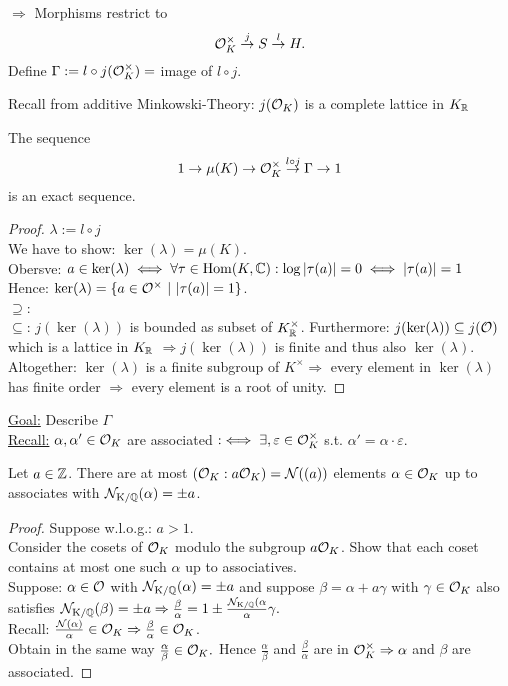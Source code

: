 
$\Rightarrow$ Morphisms restrict to
\[ \mathcal{O}_K^\times \stackrel{j}{\to} S \stackrel{l}{\to} H.\]
Define $\Gamma:= l \circ j (\mathcal{O}_K^\times) =$ image of $l \circ j$.

Recall from additive Minkowski-Theory: $j( \mathcal{O}_K)$ is a complete lattice in $K_{\mathbb{R}}$

\begin{Prop}
The sequence
\[1 \to \mu(K) \to \mathcal{O}_K^\times \stackrel{l \circ j}{\to} \Gamma \to 1\]
is an exact sequence.
\end{Prop}

\begin{proof}
$\lambda:= l \circ j$\\
We have to show: $\ker(\lambda)=\mu(K)$.\\
Obersve: $a \in \ker(\lambda) \iff \forall \tau \in \operatorname{Hom}(K, \mathbb{C}) : \log|\tau(a)|=0 \iff |\tau(a)|=1$\\
Hence: $\ker(\lambda) = \{a \in \mathcal{O}^\times \ | \ |\tau(a)|=1\}$.\\
\glqq $\supseteq$\grqq: \checkmark\\
\glqq $\subseteq$\grqq: $j(\ker(\lambda))$ is bounded as subset of $K_{\mathbb{R}}^\times$. Furthermore: $j(\ker(\lambda)) \subseteq j(\mathcal{O})$ which is a lattice in $K_{\mathbb{R}}$
$\Rightarrow j(\ker(\lambda))$ is finite and thus also $\ker(\lambda)$.\\
Altogether: $\ker(\lambda)$ is a finite subgroup of $K^\times \Rightarrow$ every element in $\ker(\lambda)$ has finite order $\Rightarrow$ every element is a root of unity.
\end{proof}

\underline{Goal:} Describe $\Gamma$\\
\underline{Recall:} $\alpha, \alpha' \in \mathcal{O}_K$ are associated $:\iff \exists, \varepsilon \in \mathcal{O}^\times_K$ s.t. $\alpha'=\alpha\cdot \varepsilon$.

\begin{Prop}
Let $a \in \mathbb{Z}$. There are at most $(\mathcal{O}_K: a\mathcal{O}_K)=\operatorname{\mathcal{N}}((a))$ elements $\alpha \in \mathcal{O}_K$ up to associates with $\operatorname{\mathcal{N}_{K/\mathbb{Q}}}(\alpha)=\pm a$.
\end{Prop}

\begin{proof}
Suppose w.l.o.g.: $a >1$.\\
Consider the cosets of $\mathcal{O}_K$ modulo the subgroup $a \mathcal{O}_K$. Show that each coset contains at most one such $\alpha$ up to associatives.\\
Suppose: $\alpha \in \mathcal{O}$ with $\operatorname{\mathcal{N}_{K/\mathbb{Q}}}(\alpha)=\pm a$ and suppose $\beta = \alpha + a \gamma$ with $\gamma \in \mathcal{O}_K$ also satisfies $\operatorname{\mathcal{N}_{K/\mathbb{Q}}}(\beta)=\pm a \Rightarrow \frac{\beta}{\alpha} = 1 \pm \frac{\operatorname{\mathcal{N}_{K/\mathbb{Q}}}(\alpha}{\alpha} \gamma.$\\
Recall: $\frac{\operatorname{\mathcal{N}}(\alpha)}{\alpha} \in \mathcal{O}_K \Rightarrow \frac{\beta}{\alpha} \in \mathcal{O}_K$.\\
Obtain in the same way $\frac{\alpha}{\beta} \in \mathcal{O}_K.$ Hence $\frac{\alpha}{\beta}$ and $\frac{\beta}{\alpha}$ are in $\mathcal{O}_K^\times \Rightarrow \alpha$ and $\beta$ are associated.
\end{proof}

